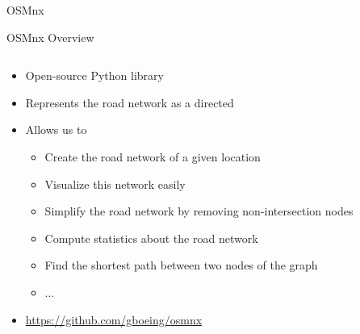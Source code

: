 \documentclass[aspectratio=169]{beamer}
\begin{document}
\begin{frame}{OSMnx \cite{boeing2017osmnx}}

\begin{center}
{\LARGE OSMnx Overview}
\end{center}

\begin{columns}
\begin{column}{0.75\textwidth}
	
	\begin{itemize}
		\item Open-source Python library
		\item Represents the road network as a directed
		\item Allows us to
		\begin{itemize}
			\item Create the road network of a given location
			\item Visualize this network easily
			\item Simplify the road network by removing non-intersection nodes
			\item Compute statistics about the road network
			\item Find the shortest path between two nodes of the graph
			\item ...
		\end{itemize}
		\item \url{https://github.com/gboeing/osmnx}
	\end{itemize}
\end{column}
\begin{column}{0.25\textwidth}  %
    \begin{center}

\end{center}
\end{column}
\end{columns}
\end{frame}
\end{document}
